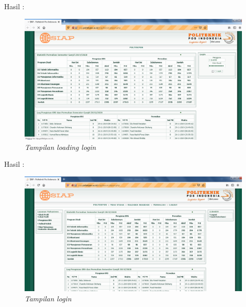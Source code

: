 \begin{enumerate}
\newpage

Hasil :
\begin{figure}[H]
    	\centering
    	\includegraphics[scale=0.3]{figures/hasillogin.png}
    	\caption{\textit{Tampilan loading login}}
    	\label{CLI}
	\end{figure}
	
Hasil :
\begin{figure}[H]
    	\centering
    	\includegraphics[scale=0.3]{figures/hasillogin1.png}
    	\caption{\textit{Tampilan login}}
    	\label{CLI}
	\end{figure}



\end{enumerate}
